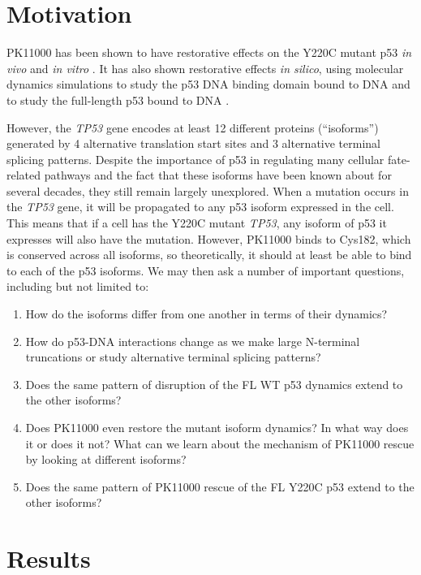 \section{Motivation}

PK11000 has been shown to have restorative effects on the Y220C mutant p53  \textit{in vivo} and \textit{in vitro} \parencite{bauer2SulfonylpyrimidinesMildAlkylating2016}. It has also shown restorative effects \textit{in silico}, using molecular dynamics simulations to study the p53 DNA binding domain bound to DNA \parencite{hanInsightsRationalDesign2022} and to study the full-length p53 bound to DNA \parencite{stetsonRestorationY220CP532025}.

However, the \textit{TP53} gene encodes at least \num{12} different proteins (``isoforms'') generated by \num{4} alternative translation start sites and \num{3} alternative terminal splicing patterns. Despite the importance of p53 in regulating many cellular fate-related pathways and the fact that these isoforms have been known about for several decades, they still remain largely unexplored. When a mutation occurs in the \textit{TP53} gene, it will be propagated to any p53 isoform expressed in the cell. This means that if a cell has the Y220C mutant \textit{TP53}, any isoform of p53 it expresses will also have the mutation. However, PK11000 binds to Cys182, which is conserved across all isoforms, so theoretically, it should at least be able to bind to each of the p53 isoforms. We may then ask a number of important questions, including but not limited to:

\begin{enumerate}
\item How do the isoforms differ from one another in terms of their dynamics?
\item How do p53-DNA interactions change as we make large N-terminal truncations or study alternative terminal splicing patterns?
\item Does the same pattern of disruption of the FL WT p53 dynamics extend to the other isoforms?
\item Does PK11000 even restore the mutant isoform dynamics? In what way does it or does it not? What can we learn about the mechanism of PK11000 rescue by looking at different isoforms?
\item Does the same pattern of PK11000 rescue of the FL Y220C p53 extend to the other isoforms?
\end{enumerate}

\section{Results}

